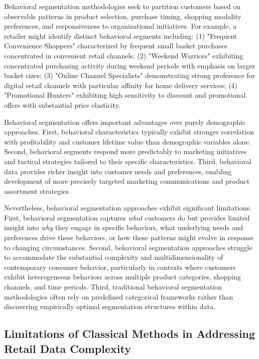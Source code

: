 \documentclass[12pt,a4paper,oneside]{report}
\begin{document}
Behavioral segmentation methodologies seek to partition customers based on observable patterns in product selection, purchase timing, shopping modality preferences, and responsiveness to organizational initiatives. For example, a retailer might identify distinct behavioral segments including: (1) "Frequent Convenience Shoppers" characterized by frequent small basket purchases concentrated in convenient retail channels; (2) "Weekend Warriors" exhibiting concentrated purchasing activity during weekend periods with emphasis on larger basket sizes; (3) "Online Channel Specialists" demonstrating strong preference for digital retail channels with particular affinity for home delivery services; (4) "Promotional Hunters" exhibiting high sensitivity to discount and promotional offers with substantial price elasticity.

Behavioral segmentation offers important advantages over purely demographic approaches. First, behavioral characteristics typically exhibit stronger correlation with profitability and customer lifetime value than demographic variables alone. Second, behavioral segments respond more predictably to marketing initiatives and tactical strategies tailored to their specific characteristics. Third, behavioral data provides richer insight into customer needs and preferences, enabling development of more precisely targeted marketing communications and product assortment strategies.

Nevertheless, behavioral segmentation approaches exhibit significant limitations. First, behavioral segmentation captures \textit{what} customers do but provides limited insight into \textit{why} they engage in specific behaviors, what underlying needs and preferences drive these behaviors, or how these patterns might evolve in response to changing circumstances. Second, behavioral segmentation approaches struggle to accommodate the substantial complexity and multidimensionality of contemporary consumer behavior, particularly in contexts where customers exhibit heterogeneous behaviors across multiple product categories, shopping channels, and time periods. Third, traditional behavioral segmentation methodologies often rely on predefined categorical frameworks rather than discovering empirically optimal segmentation structures within data.


\subsection{Limitations of Classical Methods in Addressing Retail Data Complexity}
\end{document}
